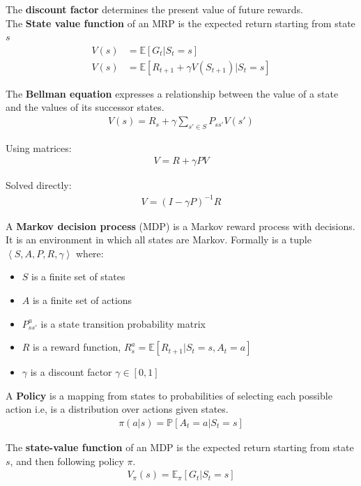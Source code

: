 \documentclass[journal]{IEEEtran}
\begin{document}
The \textbf{discount factor} determines the present value of future rewards. \\

The \textbf{State value function} of an MRP is the expected return
starting from state $s$
\begin{align*}
V(s) &= \mathbb{E} [G_t|S_t=s] \\
V(s) &= \mathbb{E} [R_{t+1} + \gamma V(S_{t+1})|S_t = s]
\end{align*} 

The \textbf{Bellman equation} expresses a relationship between the value of a state and the values of its successor states.
\begin{align*}
V(s) = R_s + \gamma \sum_{s'\in S} P_{ss'}V(s')
\end{align*}

Using matrices:
\begin{align*}
V = R + \gamma PV
\end{align*}

Solved directly:
\begin{align*}
V = (I - \gamma P)^{-1}R
\end{align*}

A \textbf{Markov decision process} (MDP) is a Markov reward process with decisions. It is an environment in which all states are Markov. Formally is a tuple $\left\langle S, A, P, R, \gamma \right\rangle$ where:
\begin{itemize}
	\item $S$ is a finite set of states
	\item $A$ is a finite set of actions
	\item $P_{ss'}^a$ is a state transition probability matrix
	\item $R$ is a reward function, $R_s^a = \mathbb{E} [R_{t+1}|S_t=s,A_t=a]$
	\item $\gamma$ is a discount factor $\gamma \in [0,1]$
\end{itemize}

A \textbf{Policy} is a mapping from states to probabilities of selecting each possible action i.e, is a distribution over actions given states.
\begin{align*}
\pi(a|s) = \mathbb{P} [A_t=a|S_t =s] 
\end{align*}

The \textbf{state-value function} of an MDP is the expected return starting from state $s$, and then following policy $\pi$.
\begin{align*}
V_\pi (s) = \mathbb{E}_\pi [G_t|S_t=s]
\end{align*}
\end{document}
